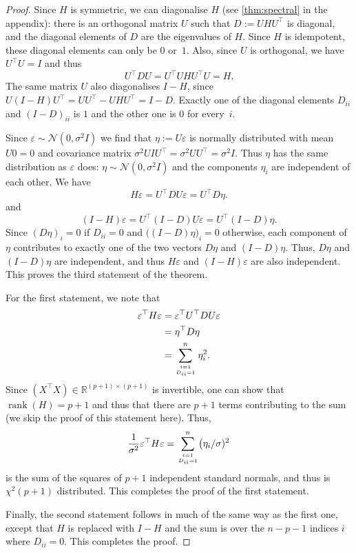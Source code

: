 \documentclass[
  a4paper,
]{article}
\theoremstyle{definition}
\theoremstyle{definition}
\theoremstyle{definition}
\theoremstyle{definition}
\theoremstyle{remark}
\begin{document}
\begin{proof}
Since \(H\) is symmetric, we can diagonalise \(H\) (see \ref{thm:spectral}
in the appendix): there is an orthogonal matrix \(U\) such that
\(D := U H U^\top\) is diagonal, and the diagonal elements of \(D\) are
the eigenvalues of \(H\). Since \(H\) is idempotent, these diagonal elements
can only be \(0\) or~\(1\). Also, since \(U\) is orthogonal, we have \(U^\top U = I\)
and thus
\begin{equation*}
  U^\top D U
  = U^\top U H U^\top U
  = H.
\end{equation*}
The same matrix \(U\) also diagonalises \(I-H\), since
\(U (I -H) U^\top = U U^\top - U H U^\top = I - D\). Exactly one
of the diagonal elements \(D_{ii}\) and \((I - D)_{ii}\) is \(1\) and the other
one is \(0\) for every~\(i\).

Since \(\varepsilon\sim \mathcal{N}(0, \sigma^2 I)\) we find that \(\eta := U \varepsilon\) is normally
distributed with mean \(U 0 = 0\) and covariance matrix \(\sigma^2 U I U^\top = \sigma^2 U U^\top = \sigma^2 I\). Thus \(\eta\) has the same distribution as
\(\varepsilon\) does: \(\eta \sim \mathcal{N}(0, \sigma^2I)\) and the components \(\eta_i\)
are independent of each other. We have
\begin{equation*}
  H \varepsilon
  = U^\top D U \varepsilon
  = U^\top D \eta.
\end{equation*}
and
\begin{equation*}
  (I - H) \varepsilon
  = U^\top (I - D) U \varepsilon
  = U^\top (I - D) \eta.
\end{equation*}
Since \((D\eta)_i = 0\) if \(D_{ii}=0\) and \(\bigl((I - D) \eta)_i = 0\)
otherwise, each component of \(\eta\) contributes to exactly one of the
two vectors \(D\eta\) and \((I-D)\eta\). Thus, \(D\eta\) and \((I-D)\eta\)
are independent, and thus \(H\varepsilon\) and \((I - H)\varepsilon\) are also independent.
This proves the third statement of the theorem.

For the first statement, we note that
\begin{align*}
  \varepsilon^\top H \varepsilon
  &= \varepsilon^\top U^\top D U \varepsilon\\
  &= \eta^\top D \eta \\
  &= \sum_{i=1 \atop D_{ii}=1}^n \eta_i^2.
\end{align*}
Since \((X^\top X) \in\mathbb{R}^{(p+1)\times (p+1)}\) is invertible, one can show
that \(\mathop{\mathrm{rank}}(H) = p+1\) and thus that there are \(p+1\) terms contributing
to the sum (we skip the proof of this statement here). Thus,
\begin{equation*}
  \frac{1}{\sigma^2} \varepsilon^\top H \varepsilon
  = \sum_{i=1 \atop D_{ii}=1}^n \bigl(\eta_i/\sigma)^2
\end{equation*}
is the sum of the squares of \(p+1\) independent standard normals,
and thus is \(\chi^2(p+1)\) distributed. This completes the proof of the
first statement.

Finally, the second statement follows in much of the same way as the
first one, except that \(H\) is replaced with \(I-H\) and the sum is
over the \(n - p - 1\) indices \(i\) where \(D_{ii} = 0\).
This completes the proof.
\end{proof}
\end{document}
